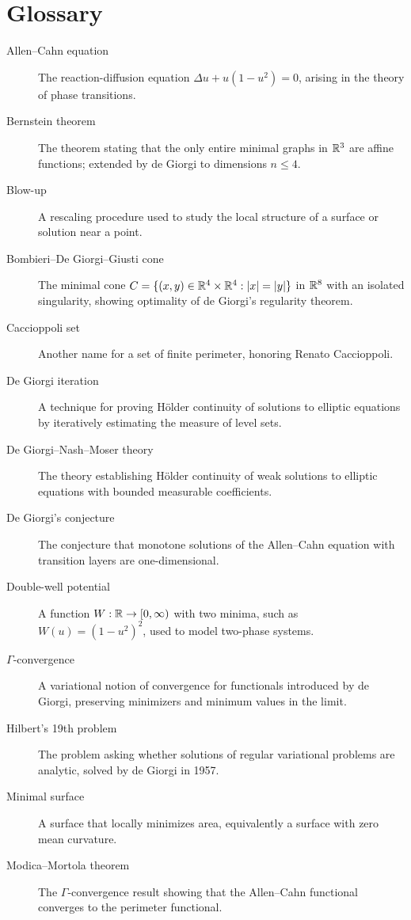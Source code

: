 \section*{Glossary}

\begin{description}
    \item[Allen--Cahn equation] The reaction-diffusion equation \(\Delta u + u(1-u^2) = 0\), arising in the theory of phase transitions.
    \item[Bernstein theorem] The theorem stating that the only entire minimal graphs in \(\mathbb{R}^3\) are affine functions; extended by de Giorgi to dimensions \(n \leq 4\).
    \item[Blow-up] A rescaling procedure used to study the local structure of a surface or solution near a point.
    \item[Bombieri--De Giorgi--Giusti cone] The minimal cone \(C = \{(x,y) \in \mathbb{R}^4 \times \mathbb{R}^4 : |x| = |y|\}\) in \(\mathbb{R}^8\) with an isolated singularity, showing optimality of de Giorgi's regularity theorem.
    \item[Caccioppoli set] Another name for a set of finite perimeter, honoring Renato Caccioppoli.
    \item[De Giorgi iteration] A technique for proving H\"older continuity of solutions to elliptic equations by iteratively estimating the measure of level sets.
    \item[De Giorgi--Nash--Moser theory] The theory establishing H\"older continuity of weak solutions to elliptic equations with bounded measurable coefficients.
    \item[De Giorgi's conjecture] The conjecture that monotone solutions of the Allen--Cahn equation with transition layers are one-dimensional.
    \item[Double-well potential] A function \(W: \mathbb{R} \to [0,\infty)\) with two minima, such as \(W(u) = (1-u^2)^2\), used to model two-phase systems.
    \item[\(\Gamma\)-convergence] A variational notion of convergence for functionals introduced by de Giorgi, preserving minimizers and minimum values in the limit.
    \item[Hilbert's 19th problem] The problem asking whether solutions of regular variational problems are analytic, solved by de Giorgi in 1957.
    \item[Minimal surface] A surface that locally minimizes area, equivalently a surface with zero mean curvature.
    \item[Modica--Mortola theorem] The \(\Gamma\)-convergence result showing that the Allen--Cahn functional converges to the perimeter functional.

\end{description}
